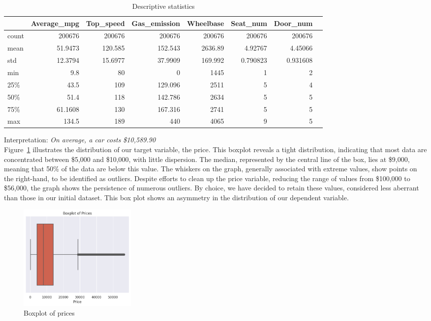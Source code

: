 \documentclass[12pt]{article}
\begin{document}
\begin{table}[h]
    \centering
    \begin{tabular}{lrrrrrrr}
    \toprule
           & Average\_mpg & Top\_speed & Gas\_emission & Wheelbase & Seat\_num & Door\_num \\
    \midrule
     count & 200676 & 200676 & 200676 & 200676 & 200676 & 200676 \\
     mean & 51.9473 & 120.585 & 152.543 & 2636.89 & 4.92767 & 4.45066 \\
     std & 12.3794 & 15.6977 & 37.9909 & 169.992 & 0.790823 & 0.931608 \\
     min & 9.8 & 80 & 0 & 1445 & 1 & 2 \\
     25\% & 43.5 & 109 & 129.096 & 2511 & 5 & 4 \\
     50\% & 51.4 & 118 & 142.786 & 2634 & 5 & 5 \\
     75\% & 61.1608 & 130 & 167.316 & 2741 & 5 & 5 \\
     max & 134.5 & 189 & 440 & 4065 & 9 & 5 \\
    \bottomrule
    \end{tabular}
    \caption{ Descriptive statistics}
    \label{Descriptive_statistics}
\end{table}

\FloatBarrier

\noindent Interpretation: \textit{On average, a car costs \$10,589.90} \\

\noindent Figure~\ref{Boxplot prices} illustrates the distribution of our target variable, the price. This boxplot reveals a tight distribution, indicating that most data are concentrated between \$5,000 and \$10,000, with little dispersion. The median, represented by the central line of the box, lies at \$9,000, meaning that 50\% of the data are below this value. 
\noindent The whiskers on the graph, generally associated with extreme values, show points on the right-hand, to be identified as outliers. Despite efforts to clean up the price variable, reducing the range of values from \$100,000 to \$56,000, the graph shows the persistence of numerous outliers. By choice, we have decided to retain these values, considered less aberrant than those in our initial dataset.
\noindent This box plot shows an asymmetry in the distribution of our dependent variable.

\FloatBarrier
\begin{figure}[ht]
    \centering
    \includegraphics[width=0.28\textwidth]{boxplot price.png}
    \caption{Boxplot of prices}
    \label{Boxplot prices}
\end{figure}
\FloatBarrier
\end{document}
